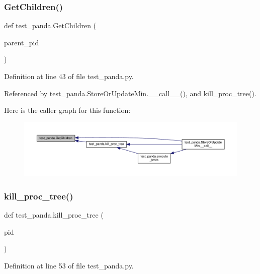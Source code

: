 \subsubsection{\texorpdfstring{Get\+Children()}{GetChildren()}}
{\footnotesize\ttfamily def test\+\_\+panda.\+Get\+Children (\begin{DoxyParamCaption}\item[{}]{parent\+\_\+pid }\end{DoxyParamCaption})}



Definition at line 43 of file test\+\_\+panda.\+py.



Referenced by test\+\_\+panda.\+Store\+Or\+Update\+Min.\+\_\+\+\_\+call\+\_\+\+\_\+(), and kill\+\_\+proc\+\_\+tree().

Here is the caller graph for this function\+:
\nopagebreak
\begin{figure}[H]
\begin{center}
\leavevmode
\includegraphics[width=350pt]{d0/dee/namespacetest__panda_a146f3fdf19c2b31d27990e1c44872718_icgraph}
\end{center}
\end{figure}
\mbox{\label{namespacetest__panda_adecb03888c930482a0044c4db02e9449}} 
\subsubsection{\texorpdfstring{kill\+\_\+proc\+\_\+tree()}{kill\_proc\_tree()}}
{\footnotesize\ttfamily def test\+\_\+panda.\+kill\+\_\+proc\+\_\+tree (\begin{DoxyParamCaption}\item[{}]{pid }\end{DoxyParamCaption})}



Definition at line 53 of file test\+\_\+panda.\+py.



